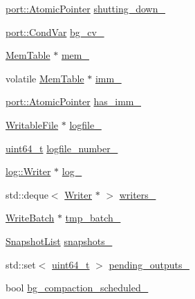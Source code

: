\begin{DoxyCompactItemize}
\hyperlink{classleveldb_1_1port_1_1_atomic_pointer}{port\+::\+Atomic\+Pointer} \hyperlink{classleveldb_1_1_d_b_impl_a11435d0d1f43c76d34b3133c91c2afe4}{shutting\+\_\+down\+\_\+}
\item 
\hyperlink{classleveldb_1_1port_1_1_cond_var}{port\+::\+Cond\+Var} \hyperlink{classleveldb_1_1_d_b_impl_a44a499ab00f5139ffbca3a57707bd2d2}{bg\+\_\+cv\+\_\+}
\item 
\hyperlink{classleveldb_1_1_mem_table}{Mem\+Table} $\ast$ \hyperlink{classleveldb_1_1_d_b_impl_aefd884bca37cac9d0ca8e95bcfe3cf99}{mem\+\_\+}
\item 
volatile \hyperlink{classleveldb_1_1_mem_table}{Mem\+Table} $\ast$ \hyperlink{classleveldb_1_1_d_b_impl_a520b4eee698988271b56558a5363c235}{imm\+\_\+}
\item 
\hyperlink{classleveldb_1_1port_1_1_atomic_pointer}{port\+::\+Atomic\+Pointer} \hyperlink{classleveldb_1_1_d_b_impl_a9185615d9bbbee710a20a91fe2920840}{has\+\_\+imm\+\_\+}
\item 
\hyperlink{classleveldb_1_1_writable_file}{Writable\+File} $\ast$ \hyperlink{classleveldb_1_1_d_b_impl_aa4a09862f1997dfe4113660aff9faca3}{logfile\+\_\+}
\item 
\hyperlink{stdint_8h_aaa5d1cd013383c889537491c3cfd9aad}{uint64\+\_\+t} \hyperlink{classleveldb_1_1_d_b_impl_afe73d34a9bf23ef0847a879ae697b49c}{logfile\+\_\+number\+\_\+}
\item 
\hyperlink{classleveldb_1_1log_1_1_writer}{log\+::\+Writer} $\ast$ \hyperlink{classleveldb_1_1_d_b_impl_a3e9f6cad8fa559b2afcee4774baee316}{log\+\_\+}
\item 
std\+::deque$<$ \hyperlink{structleveldb_1_1_d_b_impl_1_1_writer}{Writer} $\ast$ $>$ \hyperlink{classleveldb_1_1_d_b_impl_a6f810e4d78d7cae052c365dfd3ceea7f}{writers\+\_\+}
\item 
\hyperlink{classleveldb_1_1_write_batch}{Write\+Batch} $\ast$ \hyperlink{classleveldb_1_1_d_b_impl_a2d49c9995c09c4dffed36f4d913e66ef}{tmp\+\_\+batch\+\_\+}
\item 
\hyperlink{classleveldb_1_1_snapshot_list}{Snapshot\+List} \hyperlink{classleveldb_1_1_d_b_impl_ad8e023a20abe62817c3fad7fbff5bd00}{snapshots\+\_\+}
\item 
std\+::set$<$ \hyperlink{stdint_8h_aaa5d1cd013383c889537491c3cfd9aad}{uint64\+\_\+t} $>$ \hyperlink{classleveldb_1_1_d_b_impl_ae4ac10358a8b616a0d1091489730b760}{pending\+\_\+outputs\+\_\+}
\item 
bool \hyperlink{classleveldb_1_1_d_b_impl_a0f9a6ce141d1aace77fc15538b0d7f63}{bg\+\_\+compaction\+\_\+scheduled\+\_\+}

\end{DoxyCompactItemize}
